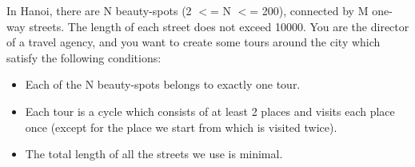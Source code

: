 In Hanoi, there are N beauty-spots (2 $<$= N $<$= 200), connected by M one-way streets. The length of each street does not exceed 10000. You are the director of a travel agency, and you want to create some tours around the city which satisfy the following conditions:

 
\begin{itemize}
	\item  Each of the N beauty-spots belongs to exactly one tour.

 
	\item  Each tour is a cycle which consists of at least 2 places and visits each place once (except for the place we start from which is visited twice). 

 
	\item  The total length of all the streets we use is minimal.

 
\end{itemize}